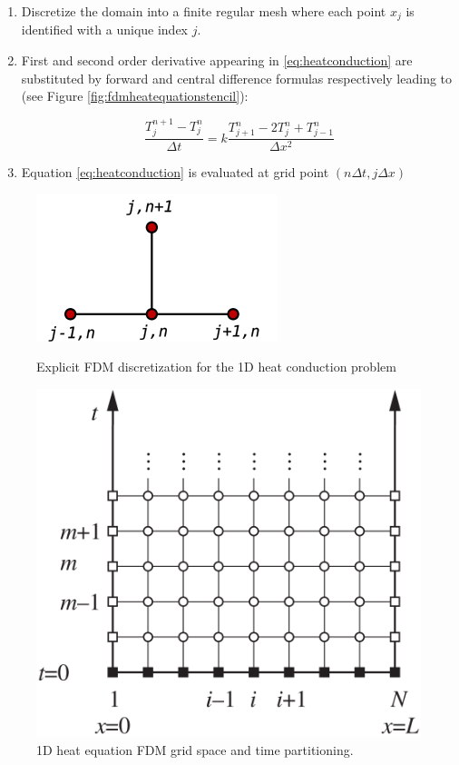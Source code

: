  \begin{enumerate}
 
 \item Discretize the domain into a finite regular mesh where each point $x_j$ is identified with a unique index $j$.
    
 \item  First and second order derivative appearing in \ref{eq:heatconduction} are substituted by forward and central difference formulas respectively leading to (see Figure  \ref{fig:fdmheatequationstencil}):
 
 \begin{equation}
  \frac{T^{n+1}_{j} - T^n_{j}}{\Delta t} = k \frac{T^n_{j+1}- 2T^n_{j} + T^n_{j-1}}{\Delta x^2}
 \label{eq:discretizedheatequation}
 \end{equation}
 
 \item Equation \ref{eq:heatconduction} is evaluated at grid point $(n\Delta t, j \Delta x)$ 
    
\end{enumerate}    
    
\begin{figure}
\centering
\includegraphics[scale=0.5]{./images/CA_FDM/heatstencil}
\label{fig:fdmheatequationstencil}
\caption{Explicit FDM discretization for the 1D heat conduction problem}\label{torus}
\end{figure}    
    
\begin{figure}
\centering
\includegraphics[scale=0.3]{./images/CA_FDM/fdmgrid}
\caption{1D heat equation FDM grid space and time partitioning.}\label{torus}
\end{figure}

